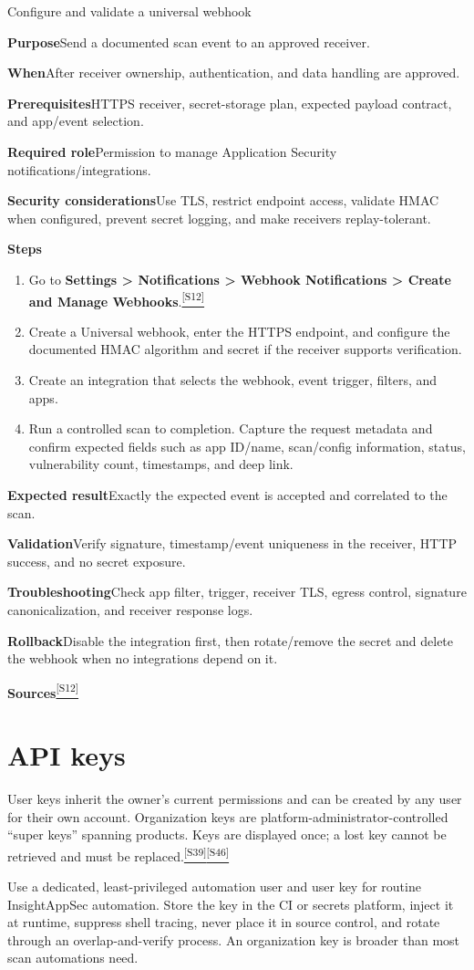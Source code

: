 \documentclass[11pt,letterpaper,oneside]{scrreprt}
\newcommand{\src}[1]{\hyperref[src:#1]{\textsuperscript{\color{R7Orange}[#1]}}}
\newcommand{\uipath}[1]{\textsf{\textbf{#1}}}
\newcommand{\field}[1]{\par\smallskip\noindent\textbf{#1}\quad}
\begin{document}
\begin{procedure}{Configure and validate a universal webhook}
\field{Purpose}Send a documented scan event to an approved receiver.
\field{When}After receiver ownership, authentication, and data handling are approved.
\field{Prerequisites}HTTPS receiver, secret-storage plan, expected payload contract, and app/event selection.
\field{Required role}Permission to manage Application Security notifications/integrations.
\field{Security considerations}Use TLS, restrict endpoint access, validate HMAC when configured, prevent secret logging, and make receivers replay-tolerant.
\field{Steps}
\begin{enumerate}
  \item Go to \uipath{Settings > Notifications > Webhook Notifications > Create and Manage Webhooks}.\src{S12}
  \item Create a Universal webhook, enter the HTTPS endpoint, and configure the documented HMAC algorithm and secret if the receiver supports verification.
  \item Create an integration that selects the webhook, event trigger, filters, and apps.
  \item Run a controlled scan to completion. Capture the request metadata and confirm expected fields such as app ID/name, scan/config information, status, vulnerability count, timestamps, and deep link.
\end{enumerate}
\field{Expected result}Exactly the expected event is accepted and correlated to the scan.
\field{Validation}Verify signature, timestamp/event uniqueness in the receiver, HTTP success, and no secret exposure.
\field{Troubleshooting}Check app filter, trigger, receiver TLS, egress control, signature canonicalization, and receiver response logs.
\field{Rollback}Disable the integration first, then rotate/remove the secret and delete the webhook when no integrations depend on it.
\field{Sources}\src{S12}
\end{procedure}

\section{API keys}
User keys inherit the owner's current permissions and can be created by any user for their own account. Organization keys are platform-administrator-controlled ``super keys'' spanning products. Keys are displayed once; a lost key cannot be retrieved and must be replaced.\src{S39}\src{S46}

\begin{oprec}
Use a dedicated, least-privileged automation user and user key for routine InsightAppSec automation. Store the key in the CI or secrets platform, inject it at runtime, suppress shell tracing, never place it in source control, and rotate through an overlap-and-verify process. An organization key is broader than most scan automations need.
\end{oprec}
\end{document}
